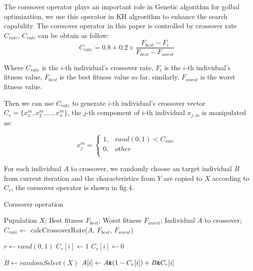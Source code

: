 \documentclass[10pt,journal,compsoc]{IEEEtran}
\begin{document}
The corssover operator plays an important role in Genetic algorithm for golbal optimization, we use this operator in KH algrorithm to enhance the search capability. The corssover operator in this paper is controlled by crossover rate $C_{rate}$, $C_{rate}$ can be obtain as follow:
\begin{equation}
C_{rate} = 0.8 + 0.2 \times \frac{F_{best}-F_{i}}{F_{best}-F_{worst}}
\end{equation}

Where $C_{rate}$ is the $i$-th individual's crossover rate, $F_{i}$ is the $i$-th individual's fitness value, $F_{best}$ is the best fitness value so far, similarly, $F_{worst}$ is the worst fitness value.

Then we can use $C_{rate}$ to generate $i$-th individual's crossover vector $C_r = \{x_{1}^m,x_{2}^m,...,x_{n}^m\}$, the $j$-th compoment of $i$-th individual $x_{j,m}$ is manipulated as:

\begin{equation}
x_{j}^m=
\begin{cases}
1,& rand(0,1) < C_{rate}\\
0,& other\\
\end{cases}
\end{equation}

For each individual $A$ to crossover, we randomly choose an target individual $B$ from current iteration and the characteristics from $Y$ are copied to $X$ according to $C_r$, the corssover operator is shown in fig.4.


\begin{algorithm}
\caption{Corssover operation}
\label{alg2}
\begin{algorithmic}[1]

\REQUIRE Pupulation $X$; Best fitness $F_{best}$; Worst fitness $F_{worst}$; Individual $A$ to crossover;
\STATE $C_{rate} \leftarrow$ calcCrossoverRate($A$, $F_{best}$, $F_{worst}$)

\STATE $r \leftarrow rand(0,1)$
\STATE $C_r[i] \leftarrow 1$
\ELSE
\STATE $C_r[i] \leftarrow 0$
\ENDIF
\ENDFOR

\STATE $B \leftarrow randomSelect(X)$
\STATE $A[i] \leftarrow A \verb'&'  (1-C_r[i]) + B \verb'&' C_r[i]$ 
\ENDFOR

\end{algorithmic}
\end{algorithm}
\end{document}

